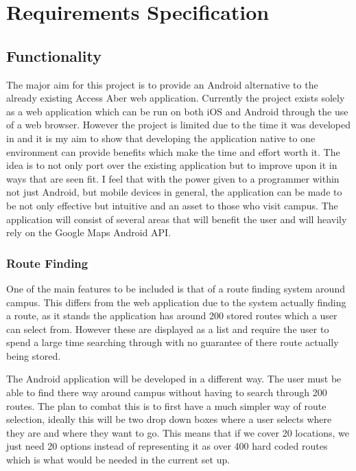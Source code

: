 \chapter{Requirements Specification}

\section{Functionality}

The major aim for this project is to provide an Android alternative to the already existing Access Aber web application\cite{aa}. Currently the project exists solely as a web application which can be run on both iOS and Android through the use of a web browser. However the project is limited due to the time it was developed in and it is my aim to show that developing the application native to one environment can provide benefits which make the time and effort worth it. The idea is to not only port over the existing application but to improve upon it in ways that are seen fit. I feel that with the power given to a programmer within not just Android, but mobile devices in general, the application can be made to be not only effective but intuitive and an asset to those who visit campus. The application will consist of several areas that will benefit the user and will heavily rely on the Google Maps Android API\cite{maps}. 
\subsection{Route Finding}
One of the main features to be included is that of a route finding system around campus. This differs from the web application due to the system actually finding a route, as it stands the application has around 200 stored routes which a user can select from. However these are displayed as a list and require the user to spend a large time searching through with no guarantee of there route actually being stored.

The Android application will be developed in a different way. The user must be able to find there way around campus without having to search through 200 routes. The plan to combat this is to first have a much simpler way of route selection, ideally this will be two drop down boxes where a user selects where they are and where they want to go. This means that if we cover 20 locations, we just need 20 options instead of representing it as over 400 hard coded routes which is what would be needed in the current set up. 

